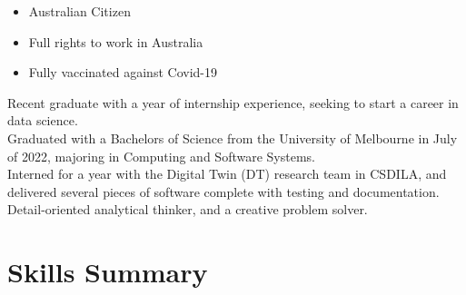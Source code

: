 \documentclass{article}
\begin{document}
\hrulefill

\begin{itemize}
	\item Australian Citizen
	\item Full rights to work in Australia
	\item Fully vaccinated against Covid-19
\end{itemize}

\hrulefill

Recent graduate with a year of internship experience, seeking to start a career in data science.
\bigskip\\
Graduated with a Bachelors of Science from the University of Melbourne in July of 2022, majoring in Computing and Software Systems.
\bigskip\\
Interned for a year with the Digital Twin (DT) research team in CSDILA, and delivered several pieces of software complete with testing and documentation.
\bigskip\\
Detail-oriented analytical thinker, and a creative problem solver.

\hrulefill

\section*{Skills Summary}
\end{document}
